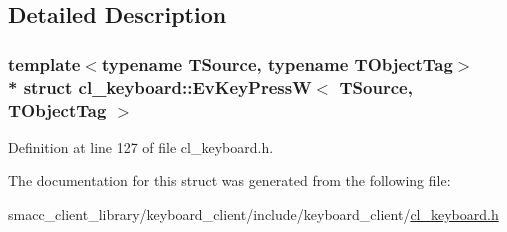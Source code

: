 \subsection{Detailed Description}
\subsubsection*{template$<$typename T\+Source, typename T\+Object\+Tag$>$\\*
struct cl\+\_\+keyboard\+::\+Ev\+Key\+Press\+W$<$ T\+Source, T\+Object\+Tag $>$}



Definition at line 127 of file cl\+\_\+keyboard.\+h.



The documentation for this struct was generated from the following file\+:\begin{DoxyCompactItemize}
\item 
smacc\+\_\+client\+\_\+library/keyboard\+\_\+client/include/keyboard\+\_\+client/\hyperlink{cl__keyboard_8h}{cl\+\_\+keyboard.\+h}\end{DoxyCompactItemize}
